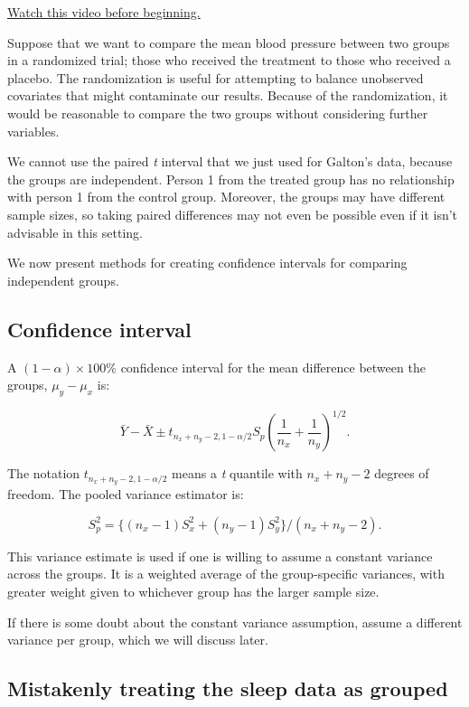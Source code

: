 \documentclass[]{article}
\begin{document}
\href{http://youtu.be/J1XqN0yumEQ?list=PLpl-gQkQivXiBmGyzLrUjzsblmQsLtkzJ}{Watch
this video before beginning.}

Suppose that we want to compare the mean blood pressure between two
groups in a randomized trial; those who received the treatment to those
who received a placebo. The randomization is useful for attempting to
balance unobserved covariates that might contaminate our results.
Because of the randomization, it would be reasonable to compare the two
groups without considering further variables.

We cannot use the paired \emph{t} interval that we just used for
Galton's data, because the groups are independent. Person 1 from the
treated group has no relationship with person 1 from the control group.
Moreover, the groups may have different sample sizes, so taking paired
differences may not even be possible even if it isn't advisable in this
setting.

We now present methods for creating confidence intervals for comparing
independent groups.

\subsection{Confidence interval}\label{confidence-interval}

A $(1 - \alpha)\times 100\%$ confidence interval for the mean difference
between the groups, $\mu_y - \mu_x$ is:

\[
\bar Y - \bar X \pm t_{n_x + n_y - 2, 1 - \alpha/2}S_p
\left( \frac{1}{n_x} + \frac{1}{n_y} \right)^{1/2}.
\]

The notation $t_{n_x + n_y - 2, 1 - \alpha/2}$ means a \emph{t} quantile
with $n_x + n_y - 2$ degrees of freedom. The pooled variance estimator
is:

\[
S_p^2 = \{(n_x - 1) S_x^2 + (n_y - 1) S_y^2\}/(n_x + n_y - 2).
\]

This variance estimate is used if one is willing to assume a constant
variance across the groups. It is a weighted average of the
group-specific variances, with greater weight given to whichever group
has the larger sample size.

If there is some doubt about the constant variance assumption, assume a
different variance per group, which we will discuss later.

\subsection{Mistakenly treating the sleep data as
grouped}\label{mistakenly-treating-the-sleep-data-as-grouped}
\end{document}
